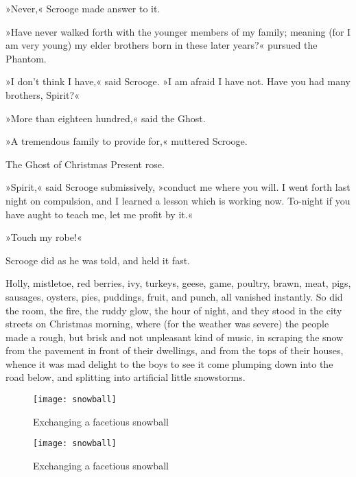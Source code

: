 »Never,« Scrooge made answer to it.

»Have never walked forth with the younger members of my family; meaning (for I am very young) my elder brothers born in these later years?« pursued the Phantom.

»I don't think I have,« said Scrooge. »I am afraid I have not. Have you had many brothers, Spirit?«

»More than eighteen hundred,« said the Ghost.

»A tremendous family to provide for,« muttered Scrooge.

The Ghost of Christmas Present rose.

»Spirit,« said Scrooge submissively, »conduct me where you will. I went forth last night on compulsion, and I learned a lesson which is working now. To-night if you have aught to teach me, let me profit by it.«

»Touch my robe!«

Scrooge did as he was told, and held it fast.

Holly, mistletoe, red berries, ivy, turkeys, geese, game, poultry, brawn, meat, pigs, sausages, oysters, pies, puddings, fruit, and  punch, all vanished instantly. So did the room, the fire, the ruddy glow, the hour of night, and they stood in the city streets on Christmas morning, where (for the weather was severe) the people made a rough, but brisk and not unpleasant kind of music, in scraping the snow from the pavement in front of their dwellings, and from the tops of their houses, whence it was mad delight to the boys to see it come plumping down into the road below, and splitting into artificial little snowstorms.

\begin{letter}
	\begin{figure}[tb]
	\centering
	\texttt{[image: snowball]}
	\caption{Exchanging a facetious snowball}
\end{figure}
\end{letter}

\begin{a4}
	\begin{figure}[tb]
	\centering
	\texttt{[image: snowball]}
	\caption{Exchanging a facetious snowball}
\end{figure}
\end{a4}




